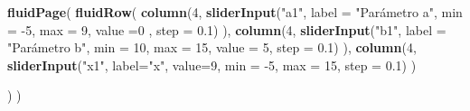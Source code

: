 \documentclass[]{book}
\newenvironment{Shaded}{\begin{snugshade}}{\end{snugshade}}
\newcommand{\DataTypeTok}[1]{\textcolor[rgb]{0.13,0.29,0.53}{#1}}
\newcommand{\DecValTok}[1]{\textcolor[rgb]{0.00,0.00,0.81}{#1}}
\newcommand{\FloatTok}[1]{\textcolor[rgb]{0.00,0.00,0.81}{#1}}
\newcommand{\KeywordTok}[1]{\textcolor[rgb]{0.13,0.29,0.53}{\textbf{#1}}}
\newcommand{\NormalTok}[1]{#1}
\newcommand{\StringTok}[1]{\textcolor[rgb]{0.31,0.60,0.02}{#1}}
\begin{document}
\begin{Shaded}
\begin{Highlighting}[]
\KeywordTok{fluidPage}\NormalTok{(}
\KeywordTok{fluidRow}\NormalTok{(}
  \KeywordTok{column}\NormalTok{(}\DecValTok{4}\NormalTok{,}
         \KeywordTok{sliderInput}\NormalTok{(}\StringTok{"a1"}\NormalTok{, }\DataTypeTok{label =} \StringTok{"Parámetro a"}\NormalTok{,}
              \DataTypeTok{min =} \DecValTok{-5}\NormalTok{, }\DataTypeTok{max =} \DecValTok{9}\NormalTok{, }\DataTypeTok{value =}\DecValTok{0}\NormalTok{ , }\DataTypeTok{step =} \FloatTok{0.1}\NormalTok{)}
\NormalTok{         ),}
  \KeywordTok{column}\NormalTok{(}\DecValTok{4}\NormalTok{,}
          \KeywordTok{sliderInput}\NormalTok{(}\StringTok{"b1"}\NormalTok{, }\DataTypeTok{label =} \StringTok{"Parámetro b"}\NormalTok{,}
                     \DataTypeTok{min =} \DecValTok{10}\NormalTok{, }\DataTypeTok{max =} \DecValTok{15}\NormalTok{, }\DataTypeTok{value =} \DecValTok{5}\NormalTok{, }\DataTypeTok{step =} \FloatTok{0.1}\NormalTok{)}
\NormalTok{         ),}
  \KeywordTok{column}\NormalTok{(}\DecValTok{4}\NormalTok{,}
         \KeywordTok{sliderInput}\NormalTok{(}\StringTok{"x1"}\NormalTok{, }\DataTypeTok{label=}\StringTok{"x"}\NormalTok{, }\DataTypeTok{value=}\DecValTok{9}\NormalTok{, }\DataTypeTok{min =} \DecValTok{-5}\NormalTok{, }\DataTypeTok{max =} \DecValTok{15}\NormalTok{, }\DataTypeTok{step =} \FloatTok{0.1}\NormalTok{)}
\NormalTok{         )}
  
\NormalTok{)}
\NormalTok{)}


\end{Highlighting}
\end{Shaded}
\end{document}
